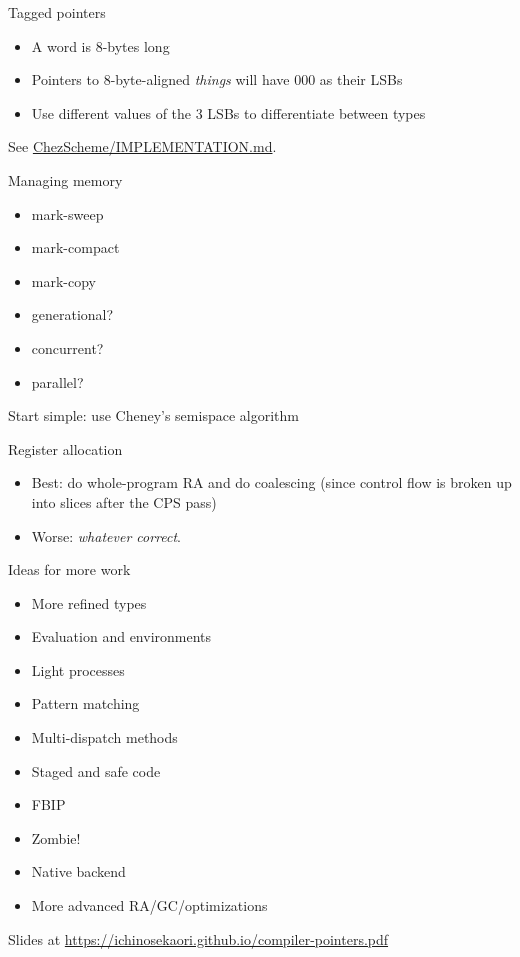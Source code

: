 \documentclass{beamer}
\begin{document}
\begin{frame}{Tagged pointers}
  \begin{itemize}
  \item A word is 8-bytes long
  \item Pointers to 8-byte-aligned \textit{things} will have 000 as their LSBs
  \item Use different values of the 3 LSBs to differentiate between types
  \end{itemize}

  See \href{https://github.com/cisco/ChezScheme/blob/main/IMPLEMENTATION.md}{ChezScheme/IMPLEMENTATION.md}.
\end{frame}

\begin{frame}{Managing memory}
  \begin{itemize}
  \item mark-sweep
  \item mark-compact
  \item mark-copy
  \item generational?
  \item concurrent?
  \item parallel?
  \end{itemize}

  Start simple: use Cheney's semispace algorithm
\end{frame}

\begin{frame}{Register allocation}
  \begin{itemize}
  \item Best: do whole-program RA and do coalescing (since control flow is broken up into slices after the CPS pass)
  \item Worse: \textit{whatever correct}.
  \end{itemize}
\end{frame}

\begin{frame}{Ideas for more work}
  \begin{itemize}
  \item More refined types
  \item Evaluation and environments
  \item Light processes
  \item Pattern matching
  \item Multi-dispatch methods
  \item Staged and safe code
  \item FBIP
  \item Zombie!
  \item Native backend
  \item More advanced RA/GC/optimizations
  \end{itemize}
\end{frame}

\begin{frame}
  \begin{center}
    Slides at \url{https://ichinosekaori.github.io/compiler-pointers.pdf}
  \end{center}
\end{frame}
\end{document}
